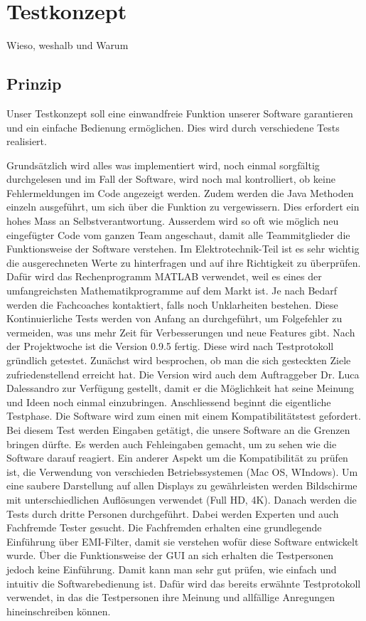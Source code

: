 \section{Testkonzept}\label{sec:testkonzept}
Wieso, weshalb und Warum
\subsection{Prinzip} \label{subsec:prinzip}

Unser Testkonzept soll eine einwandfreie Funktion unserer Software garantieren und ein einfache Bedienung ermöglichen. Dies wird durch verschiedene Tests realisiert. 

Grundsätzlich wird alles was implementiert wird, noch einmal sorgfältig durchgelesen und im Fall der Software, wird noch mal kontrolliert, ob keine Fehlermeldungen im Code angezeigt werden. Zudem werden die Java Methoden einzeln ausgeführt, um sich über die Funktion zu vergewissern. Dies erfordert ein hohes Mass an Selbstverantwortung. 
Ausserdem wird so oft wie möglich neu eingefügter Code vom ganzen Team angeschaut, damit alle Teammitglieder die Funktionsweise der Software verstehen.
Im Elektrotechnik-Teil ist es sehr wichtig die ausgerechneten Werte zu hinterfragen und auf ihre Richtigkeit zu überprüfen. Dafür wird das Rechenprogramm MATLAB verwendet, weil es eines der umfangreichsten Mathematikprogramme auf dem Markt ist. Je nach Bedarf werden die Fachcoaches kontaktiert, falls noch Unklarheiten bestehen. Diese Kontinuierliche Tests werden von Anfang an durchgeführt, um Folgefehler zu vermeiden, was uns mehr Zeit für Verbesserungen und neue Features gibt.  
Nach der Projektwoche ist die Version 0.9.5 fertig. Diese wird nach Testprotokoll gründlich getestet. Zunächst wird besprochen, ob man die sich gesteckten Ziele zufriedenstellend erreicht hat. Die Version wird auch dem Auftraggeber Dr. Luca Dalessandro zur Verfügung gestellt, damit er die Möglichkeit hat seine Meinung und Ideen noch einmal einzubringen. Anschliessend beginnt die eigentliche Testphase. Die Software wird zum einen mit einem Kompatibilitätstest gefordert. Bei diesem Test werden Eingaben getätigt, die unsere Software an die Grenzen bringen dürfte. Es werden auch Fehleingaben gemacht, um zu sehen wie die Software darauf reagiert. Ein anderer Aspekt um die Kompatibilität zu prüfen ist, die Verwendung von verschieden Betriebssystemen (Mac OS, WIndows). Um eine saubere Darstellung auf allen Displays zu gewährleisten werden Bildschirme mit unterschiedlichen Auflösungen verwendet (Full HD, 4K).
Danach werden die Tests durch dritte Personen durchgeführt. Dabei werden Experten und auch Fachfremde Tester gesucht. Die Fachfremden erhalten eine grundlegende Einführung über EMI-Filter, damit sie verstehen wofür diese Software entwickelt wurde. Über die Funktionsweise der GUI an sich erhalten die Testpersonen jedoch keine Einführung. Damit kann man sehr gut prüfen, wie einfach und intuitiv die Softwarebedienung ist. Dafür wird das bereits erwähnte Testprotokoll verwendet, in das die Testpersonen ihre Meinung und allfällige Anregungen hineinschreiben können.
